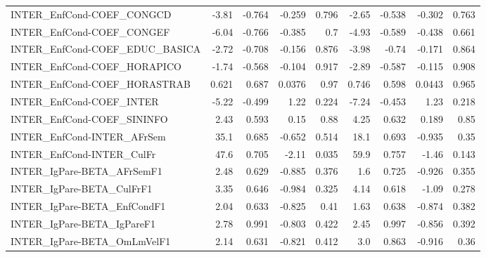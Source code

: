 \begin{tabular}{lrrrrrrrr}
INTER\_EnfCond-COEF\_CONGCD             &       -3.81 &       -0.764 &  -0.259 &    0.796 &      -2.65 &      -0.538 &       -0.302 &         0.763 \\
INTER\_EnfCond-COEF\_CONGEF             &       -6.04 &       -0.766 &  -0.385 &      0.7 &      -4.93 &      -0.589 &       -0.438 &         0.661 \\
INTER\_EnfCond-COEF\_EDUC\_BASICA        &       -2.72 &       -0.708 &  -0.156 &    0.876 &      -3.98 &       -0.74 &       -0.171 &         0.864 \\
INTER\_EnfCond-COEF\_HORAPICO           &       -1.74 &       -0.568 &  -0.104 &    0.917 &      -2.89 &      -0.587 &       -0.115 &         0.908 \\
INTER\_EnfCond-COEF\_HORASTRAB          &       0.621 &        0.687 &  0.0376 &     0.97 &      0.746 &       0.598 &       0.0443 &         0.965 \\
INTER\_EnfCond-COEF\_INTER              &       -5.22 &       -0.499 &    1.22 &    0.224 &      -7.24 &      -0.453 &         1.23 &         0.218 \\
INTER\_EnfCond-COEF\_SININFO            &        2.43 &        0.593 &    0.15 &     0.88 &       4.25 &       0.632 &        0.189 &          0.85 \\
INTER\_EnfCond-INTER\_AFrSem            &        35.1 &        0.685 &  -0.652 &    0.514 &       18.1 &       0.693 &       -0.935 &          0.35 \\
INTER\_EnfCond-INTER\_CulFr             &        47.6 &        0.705 &   -2.11 &    0.035 &       59.9 &       0.757 &        -1.46 &         0.143 \\
INTER\_IgPare-BETA\_AFrSemF1            &        2.48 &        0.629 &  -0.885 &    0.376 &        1.6 &       0.725 &       -0.926 &         0.355 \\
INTER\_IgPare-BETA\_CulFrF1             &        3.35 &        0.646 &  -0.984 &    0.325 &       4.14 &       0.618 &        -1.09 &         0.278 \\
INTER\_IgPare-BETA\_EnfCondF1           &        2.04 &        0.633 &  -0.825 &     0.41 &       1.63 &       0.638 &       -0.874 &         0.382 \\
INTER\_IgPare-BETA\_IgPareF1            &        2.78 &        0.991 &  -0.803 &    0.422 &       2.45 &       0.997 &       -0.856 &         0.392 \\
INTER\_IgPare-BETA\_OmLmVelF1           &        2.14 &        0.631 &  -0.821 &    0.412 &        3.0 &       0.863 &       -0.916 &          0.36 \\

\end{tabular}
